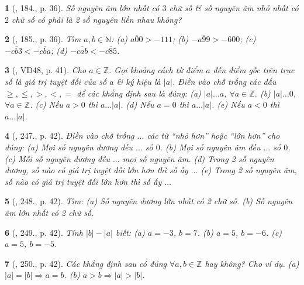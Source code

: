 \documentclass{article}
\newtheorem{baitoan}{}
\begin{document}
\begin{baitoan}[\cite{Tuyen_Toan_6}, 184., p. 36]
	Số nguyên âm lớn nhất có $3$ chữ số \& số nguyên âm nhỏ nhất có $2$ chữ số có phải là 2 số nguyên liền nhau không?
\end{baitoan}

\begin{baitoan}[\cite{Tuyen_Toan_6}, 185., p. 36]
	Tìm $a,b\in\mathbb{N}$: (a) $\overline{a00} > -111$; (b) $-\overline{a99} > -600$; (c) $-\overline{cb3} < -\overline{cba}$; (d) $-\overline{cab} < -\overline{c85}$.
\end{baitoan}

\begin{baitoan}[\cite{Binh_Toan_6_tap_1}, VD48, p. 41]
	Cho $a\in\mathbb{Z}$. Gọi khoảng cách từ điểm $a$ đến điểm gốc trên trục số là \emph{giá trị tuyệt đối} của số $a$ \& ký hiệu là $|a|$. Điền vào chỗ trống các dấu $\ge,\le,>,<,=$ để các khẳng định sau là đúng: (a) $|a|\ldots a$, $\forall a\in\mathbb{Z}$. (b) $|a|\ldots 0$, $\forall a\in\mathbb{Z}$. (c) Nếu $a > 0$ thì $a\ldots|a|$. (d) Nếu $a = 0$ thì $a\ldots|a|$. (e) Nếu $a < 0$ thì $a\ldots|a|$.	
\end{baitoan}

\begin{baitoan}[\cite{Binh_Toan_6_tap_1}, 247., p. 42]
	Điền vào chỗ trống $\ldots$ các từ ``nhỏ hơn'' hoặc ``lớn hơn'' cho đúng: (a) Mọi số nguyên dương đều $\ldots$ số $0$. (b) Mọi số nguyên âm đều $\ldots$ số $0$. (c) Mỗi số nguyên dương đều $\ldots$ mọi số nguyên âm. (d) Trong 2 số nguyên dương, số nào có giá trị tuyệt đối lớn hơn thì số ấy $\ldots$ (e) Trong 2 số nguyên âm, số nào có giá trị tuyệt đối lớn hơn thì số ấy $\ldots$	
\end{baitoan}

\begin{baitoan}[\cite{Binh_Toan_6_tap_1}, 248., p. 42]
	Tìm: (a) Số nguyên dương lớn nhất có 2 chữ số. (b) Số nguyên âm lớn nhất có 2 chữ số.	
\end{baitoan}

\begin{baitoan}[\cite{Binh_Toan_6_tap_1}, 249., p. 42]
	Tính $|b| - |a|$ biết: (a) $a = -3$, $b = 7$. (b) $a = 5$, $b = -6$. (c) $a = 5$, $b = -5$.
\end{baitoan}

\begin{baitoan}[\cite{Binh_Toan_6_tap_1}, 250., p. 42]
	Các khẳng định sau có đúng $\forall a,b\in\mathbb{Z}$ hay không? Cho ví dụ. (a) $|a| = |b|\Rightarrow a = b$. (b) $a > b\Rightarrow|a| > |b|$.	
\end{baitoan}
\end{document}
